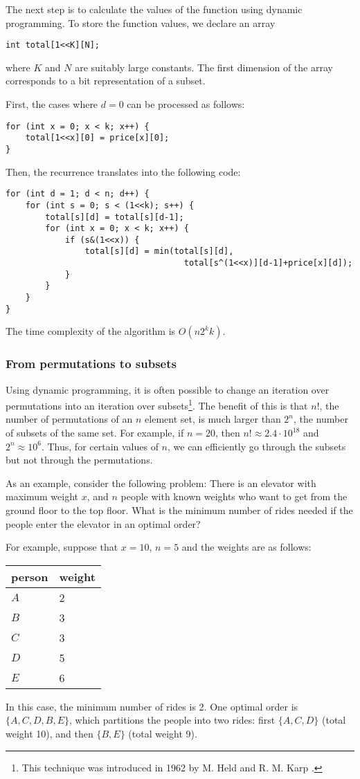 The next step is to calculate the values of the function
using dynamic programming.
To store the function values, we declare an array
\begin{lstlisting}
int total[1<<K][N];
\end{lstlisting}
where $K$ and $N$ are suitably large constants.
The first dimension of the array corresponds to a bit
representation of a subset.

First, the cases where $d=0$ can be processed as follows:
\begin{lstlisting}
for (int x = 0; x < k; x++) {
    total[1<<x][0] = price[x][0];
}
\end{lstlisting}
Then, the recurrence translates into the following code:
\begin{lstlisting}
for (int d = 1; d < n; d++) {
    for (int s = 0; s < (1<<k); s++) {
        total[s][d] = total[s][d-1];
        for (int x = 0; x < k; x++) {
            if (s&(1<<x)) {
                total[s][d] = min(total[s][d],
                                    total[s^(1<<x)][d-1]+price[x][d]);
            }
        }
    }
}
\end{lstlisting}
The time complexity of the algorithm is $O(n 2^k k)$.

\subsubsection{From permutations to subsets}

Using dynamic programming, it is often possible
to change an iteration over permutations into
an iteration over subsets\footnote{This technique was introduced in 1962
by M. Held and R. M. Karp \cite{hel62}.}.
The benefit of this is that
$n!$, the number of permutations of an $n$ element set,
is much larger than $2^n$, the number of subsets
of the same set.
For example, if $n=20$, then
$n! \approx 2.4 \cdot 10^{18}$ and $2^n \approx 10^6$.
Thus, for certain values of $n$,
we can efficiently go through the subsets but not through the permutations.

As an example, consider the following problem:
There is an elevator with maximum weight $x$,
and $n$ people with known weights
who want to get from the ground floor
to the top floor.
What is the minimum number of rides needed
if the people enter the elevator in an optimal order?

For example, suppose that $x=10$, $n=5$
and the weights are as follows:
\begin{center}
\begin{tabular}{ll}
person & weight \\
\hline
$A$ & 2 \\
$B$ & 3 \\
$C$ & 3 \\
$D$ & 5 \\
$E$ & 6 \\
\end{tabular}
\end{center}
In this case, the minimum number of rides is 2.
One optimal order is $\{A,C,D,B,E\}$,
which partitions the people into two rides:
first $\{A,C,D\}$ (total weight 10),
and then $\{B,E\}$ (total weight 9).

